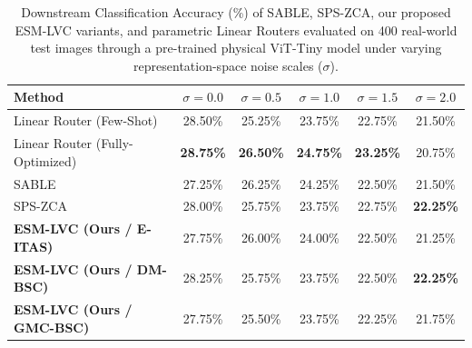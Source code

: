 \begin{table}[t]
\caption{Downstream Classification Accuracy (\%) of SABLE, SPS-ZCA, our proposed ESM-LVC variants, and parametric Linear Routers evaluated on 400 real-world test images through a pre-trained physical ViT-Tiny model under varying representation-space noise scales ($\sigma$).}
\label{tab:physical_downstream}
\vskip 0.15in
\begin{center}
\begin{small}
\begin{sc}
\begin{tabular}{lccccc}
\toprule
Method & $\sigma = 0.0$ & $\sigma = 0.5$ & $\sigma = 1.0$ & $\sigma = 1.5$ & $\sigma = 2.0$ \\
\midrule
Linear Router (Few-Shot) & 28.50\% & 25.25\% & 23.75\% & 22.75\% & 21.50\% \\
Linear Router (Fully-Optimized) & \textbf{28.75\%} & \textbf{26.50\%} & \textbf{24.75\%} & \textbf{23.25\%} & 20.75\% \\
SABLE & 27.25\% & 26.25\% & 24.25\% & 22.50\% & 21.50\% \\
SPS-ZCA & 28.00\% & 25.75\% & 23.75\% & 22.75\% & \textbf{22.25\%} \\
\textbf{ESM-LVC (Ours / E-ITAS)} & 27.75\% & 26.00\% & 24.00\% & 22.50\% & 21.25\% \\
\textbf{ESM-LVC (Ours / DM-BSC)} & 28.25\% & 25.75\% & 23.75\% & 22.50\% & \textbf{22.25\%} \\
\textbf{ESM-LVC (Ours / GMC-BSC)} & 27.75\% & 25.50\% & 23.75\% & 22.25\% & 21.75\% \\
\bottomrule
\end{tabular}
\end{sc}
\end{small}
\end{center}
\vskip -0.1in
\end{table}

